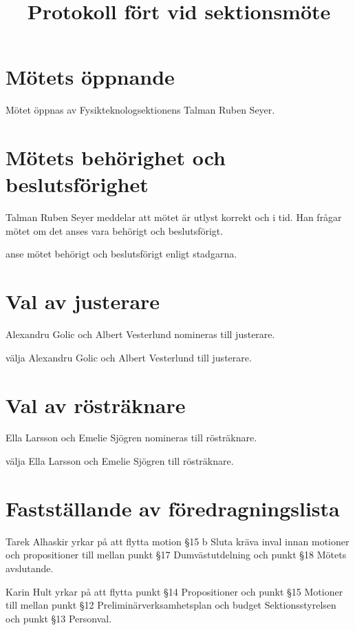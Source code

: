 \documentclass[hidelinks]{sektionsmote}
\title{Protokoll fört vid sektionsmöte}
\begin{document}
\maketitle

\section{Mötets öppnande}
Mötet öppnas \tid av Fysikteknologsektionens Talman Ruben Seyer.


\section{Mötets behörighet och beslutsförighet}
Talman Ruben Seyer meddelar att mötet är utlyst korrekt och i tid.
Han frågar mötet om det anses vara behörigt och beslutsförigt.
\begin{beslut}
    \item anse mötet behörigt och beslutsförigt enligt stadgarna.
\end{beslut}


\section{Val av justerare}
Alexandru Golic och Albert Vesterlund nomineras till justerare.
\begin{beslut}
  \item välja Alexandru Golic och Albert Vesterlund till justerare.
\end{beslut}


\section{Val av rösträknare}
Ella Larsson och Emelie Sjögren nomineras till rösträknare.
\begin{beslut}
  \item välja Ella Larsson och Emelie Sjögren till rösträknare.
\end{beslut}


\section{Fastställande av föredragningslista}
Tarek Alhaskir yrkar på att flytta motion §15 b Sluta kräva inval innan motioner och propositioner till mellan punkt §17 Dumvästutdelning och punkt §18 Mötets avslutande.

Karin Hult yrkar på att flytta punkt §14 Propositioner och punkt §15 Motioner till mellan punkt §12 Preliminärverksamhetsplan och budget Sektionsstyrelsen och punkt §13 Personval.
\end{document}
